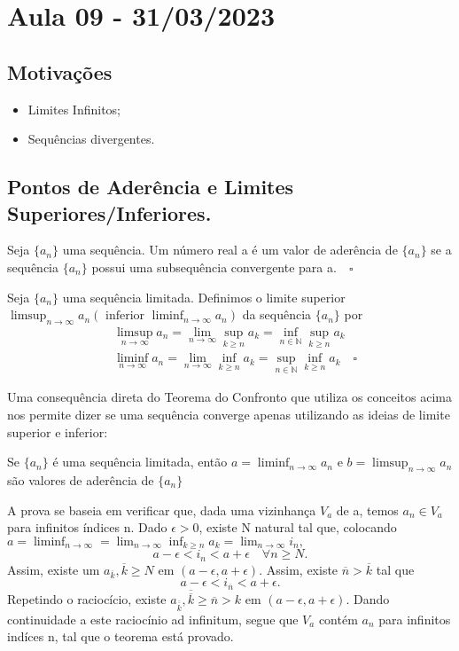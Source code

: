 \documentclass[analysis_notes.tex]{subfiles}
\begin{document}
\section{Aula 09 - 31/03/2023}
\subsection{Motiva\c c\~oes}
\begin{itemize}
	\item Limites Infinitos;
	\item Sequ\^encias divergentes.
\end{itemize}

\subsection{Pontos de Ader\^encia e Limites Superiores/Inferiores.}
\begin{def*}
	Seja $\{a_{n}\} $ uma sequ\^encia. Um n\'umero real a \'e um valor de ader\^encia de $\{a_{n}\} $ se a sequ\^encia $\{a_{n}\}$ possui
	uma subsequ\^encia convergente para a.$\quad\square$
\end{def*}
\begin{def*}
	Seja $\{a_{n}\} $  uma sequ\^encia limitada. Definimos o limite superior $\displaystyle\limsup_{n\to\infty}a_{n}(\text{ inferior }\liminf_{n\to\infty}a_{n})$ da
	sequ\^encia $\{a_{n}\} $ por
	\begin{align*}
		 & \limsup_{n\to\infty}a_{n} = \lim_{n\to\infty}\sup_{k\geq{n}}a_{k} = \inf_{n\in \mathbb{N}}\sup_{k\geq{n}}a_{k}             \\
		 & \liminf_{n\to\infty}a_{n} = \lim_{n\to\infty}\inf_{k\geq{n}}a_{k} = \sup_{n\in \mathbb{N}}\inf_{k\geq{n}}a_{k}\quad\square
	\end{align*}
\end{def*}
Uma consequ\^encia direta do Teorema do Confronto que utiliza os conceitos acima nos permite dizer se uma sequ\^encia converge apenas
utilizando as ideias de limite superior e inferior:
\begin{theorem*}
	Se $\{a_{n}\} $ \'e uma sequ\^encia limitada, ent\~ao $a = \liminf_{n\to\infty}a_{n}$ e $b = \limsup_{n\to\infty}a_{n}$
	s\~ao valores de ader\^encia de $\{a_{n}\} $
\end{theorem*}
\begin{proof*}
	A prova se baseia em verificar que, dada uma vizinhan\c ca $V_{a}$ de a, temos $a_{n}\in V_{a}$ para infinitos \'indices n.
	Dado $\epsilon > 0$, existe N natural tal que, colocando $a =\displaystyle \liminf_{n\to\infty} = \lim_{n\to\infty}\inf_{k\geq{n}}a_{k} = \lim_{n\to\infty}i_{n},$
	$$
		a - \epsilon < i_{n} < a + \epsilon \quad \forall n \geq{N}.
	$$
	Assim, existe um $a_{\overline{k}}, \overline{k}\geq{N}$ em $(a-\epsilon, a+\epsilon).$ Assim, existe $\overline{n} > \overline{k}$ tal que
	$$
		a - \epsilon < i_{\overline{n}} < a + \epsilon.
	$$
	Repetindo o racioc\'icio, existe $a_{\overline{\overline{k}}}, \overline{\overline{k}} \geq{\overline{n}} > k$ em $(a - \epsilon, a + \epsilon).$
	Dando continuidade a este racioc\'inio ad infinitum, segue que $V_{a}$ cont\'em $a_{n}$ para infinitos ind\'ices n, tal que o teorema est\'a provado. \qedsymbol
\end{proof*}
\end{document}

